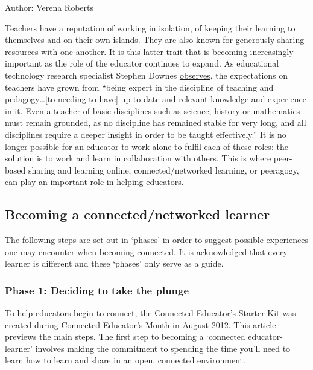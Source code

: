 Author: Verena Roberts

Teachers have a reputation of working in
isolation, of keeping their learning to themselves and on their own
islands. They are also known for generously sharing resources with one
another. It is this latter trait that is becoming increasingly important
as the role of the educator continues to expand. As educational
technology research specialist Stephen Downes
\href{http://www.huffingtonpost.com/stephen-downes/the-role-of-the-educator\_b\_790937.html}{observes},
the expectations on teachers have grown from ``being expert in the
discipline of teaching and pedagogy\ldots{}{[}to needing to have{]}
up-to-date and relevant knowledge and experience in it. Even a teacher
of basic disciplines such as science, history or mathematics must remain
grounded, as no discipline has remained stable for very long, and all
disciplines require a deeper insight in order to be taught
effectively.'' It is no longer possible for an educator to work alone to
fulfil each of these roles: the solution is to work and learn in
collaboration with others. This is where peer-based sharing and learning
online, connected/networked learning, or peeragogy, can play an
important role in helping educators.

\subsection{Becoming a connected/networked learner}

The following steps are set out in `phases' in order to suggest possible
experiences one may encounter when becoming connected. It is
acknowledged that every learner is different and these `phases' only
serve as a guide.

\subsubsection{Phase 1: Deciding to take the plunge}

To help educators begin to connect, the
\href{http://www.google.com/url?q=https\%3A\%2F\%2Fdl.dropbox.com\%2Fu\%2F38904447\%2Fstarter-kit-final.pdf\&sa=D\&sntz=1\&usg=AFQjCNE9sNo1Lz9-zJ0KH48djXeYVoAF4A}{Connected
Educator's Starter Kit} was created during Connected Educator's Month in
August 2012. This article previews the main steps. The first step to
becoming a `connected educator-learner' involves making the commitment
to spending the time you'll need to learn how to learn and share in an
open, connected environment.

